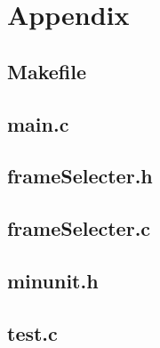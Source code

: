 \section{Appendix}

\subsection{Makefile}

\pagebreak

\subsection{main.c}

\pagebreak

\subsection{frameSelecter.h}

\pagebreak

\subsection{frameSelecter.c}

\pagebreak

\subsection{minunit.h}

\pagebreak

\subsection{test.c}
\label{app:test}

\pagebreak